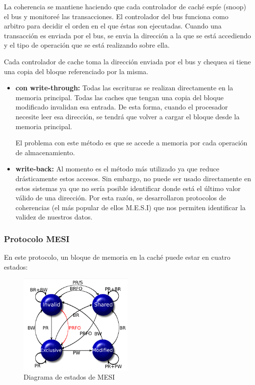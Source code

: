 La coherencia se mantiene haciendo que cada controlador de caché espíe (snoop) el bus y monitoreé las transacciones. El controlador del bus funciona como arbitro para  decidir el orden en el que éstas son ejecutadas. Cuando una transacción es enviada por el bus, se envia la dirección a la que se está accediendo y el tipo de operación que se está realizando sobre ella.

Cada controlador de cache toma la dirección enviada por el bus y chequea si tiene una copia del bloque referenciado por la misma.

\begin{itemize}
	\item \textbf{con write-through:} Todas las escrituras se realizan directamente en la memoria principal. Todas las caches que tengan una copia del bloque modificado invalidan esa entrada. De esta forma, cuando el procesador necesite leer esa dirección, se tendrá que volver a cargar el bloque desde la memoria principal.
	
	El problema con este método es que se accede a memoria por cada operación de almacenamiento.
	
	\item  \textbf{write-back:} Al momento es el método más utilizado ya que reduce drásticamente estos accesos. Sin embargo, no puede ser usado directamente en estos sistemas ya que no sería posible identificar donde está el último valor válido de una dirección. Por esta razón, se desarrollaron protocolos de coherencias (el más popular de ellos M.E.S.I) que nos permiten identificar la validez de nuestros datos.
\end{itemize}

\subsubsection{Protocolo MESI}
En este protocolo, un bloque de memoria en la caché puede estar en cuatro estados:

\begin{figure}[ht]
	\centering
	\includegraphics[width=0.5\textwidth]{imagenes/mesi-state-graph}
	\caption{Diagrama de estados de MESI}
	\label{fig:mesiDiagram}
\end{figure}

